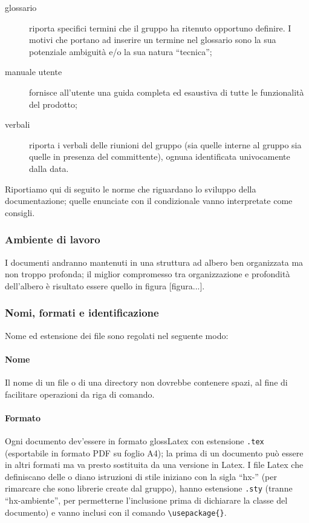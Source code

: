 \begin{itemize}
\begin{itemize}
\begin{description}
		\item[glossario] riporta specifici termini che il gruppo ha ritenuto opportuno definire. I motivi che portano ad inserire un termine nel glossario sono la sua potenziale ambiguità e/o la sua natura “tecnica”;
		\item[manuale utente] fornisce all'utente una guida completa ed esaustiva di tutte le funzionalità del prodotto;
		\item[verbali] riporta i verbali delle riunioni del gruppo (sia quelle interne al gruppo sia quelle in presenza del committente), ognuna identificata univocamente dalla data.
	\end{description}
\end{itemize}
Riportiamo qui di seguito le norme che riguardano lo sviluppo della documentazione; quelle enunciate con il condizionale vanno interpretate come consigli.

\subsubsection{Ambiente di lavoro} I documenti andranno mantenuti in una struttura ad albero ben organizzata ma non troppo profonda; il miglior compromesso tra organizzazione e profondità dell'albero è risultato essere quello in figura [figura...].

\subsubsection{Nomi, formati e identificazione} Nome ed estensione dei file sono regolati nel seguente modo:
\paragraph{Nome} Il nome di un file o di una directory non dovrebbe contenere spazi, al fine di facilitare operazioni da riga di comando.
\paragraph{Formato} Ogni documento dev'essere in formato gloss{Latex} con estensione \texttt{.tex} (esportabile in formato PDF su foglio A4); la prima  di un documento può essere in altri formati ma va presto sostituita da una versione in Latex. I file Latex che definiscano delle  o diano istruzioni di stile iniziano con la sigla “hx-” (per rimarcare che sono librerie create dal gruppo), hanno estensione \texttt{.sty} (tranne “hx-ambiente”, per permetterne l'inclusione prima di dichiarare la classe del documento) e vanno inclusi con il comando \texttt{\textbackslash usepackage\{\}}.

\end{itemize}
